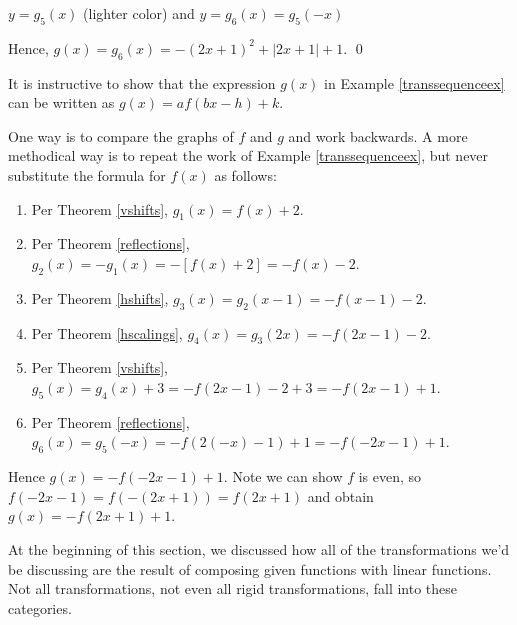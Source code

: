 \begin{ex}
\begin{enumerate}
\begin{mfigure}


\caption{$y = g_{5}(x)$ (lighter color) and $y = g_{6}(x) = g_{5}(-x)$}
\label{fig:yeqgfivexandyeqgsixx}
\end{mfigure}

\end{enumerate}

Hence, $g(x) = g_{6}(x) = -(2x+1)^2+|2x+1| + 1$.  \qed
 
\end{ex}

It is instructive to show that the expression $g(x)$ in Example \ref{transsequenceex}  can be written as $g(x) = a f(bx-h)+k$.  

One way is to compare the graphs of $f$ and $g$ and work backwards.  A more methodical way is to repeat the work of Example \ref{transsequenceex}, but never substitute the formula for $f(x)$ as follows:


\begin{enumerate}

\item  Per Theorem \ref{vshifts}, $g_{1}(x) = f(x) + 2$.

\item  Per Theorem \ref{reflections}, $g_{2}(x) = -g_{1}(x) =  -[f(x) + 2] = -f(x)-2$.

\item  Per Theorem \ref{hshifts}, $g_{3}(x) = g_{2}(x-1) = -f(x-1)-2$.

\item  Per Theorem \ref{hscalings}, $g_{4}(x) = g_{3}(2x) =-f(2x-1)-2$.

\item  Per Theorem \ref{vshifts}, $g_{5}(x) = g_{4}(x)+3 = -f(2x-1)-2 + 3 = -f(2x-1)+1$.

\item  Per Theorem \ref{reflections}, $g_{6}(x) = g_{5}(-x) =  -f(2(-x)-1)+1 = -f(-2x-1)+1$.

\end{enumerate}

Hence $g(x) =  -f(-2x-1)+1$.  Note we can show $f$ is even, so $f(-2x-1) = f(-(2x+1)) = f(2x+1)$ and obtain $g(x) = -f(2x+1)+1$.  

At the beginning of this section, we discussed how all of the transformations we'd be discussing are the result of composing given functions with linear functions.  Not all transformations, not even all rigid transformations, fall into these categories.  

